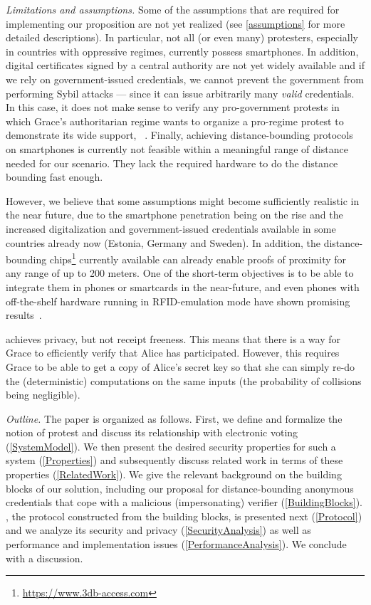 \emph{Limitations and assumptions.} Some of the assumptions that are required 
for implementing our proposition are not yet realized (see \cref{assumptions} 
for more detailed descriptions). In particular, not all (or even many) 
protesters, especially in countries with oppressive regimes, currently possess 
smartphones.
In addition, digital certificates signed by a central authority are not yet widely available and if we rely on government-issued credentials, we cannot prevent the government from performing Sybil attacks --- since it can issue arbitrarily many \emph{valid} credentials. 
In this case, it does not make sense to verify any pro-government protests in 
which Grace's authoritarian regime wants to organize a pro-regime protest to 
demonstrate its wide support, 
\eg~\cite{AlJazeeraOnVenezuela2017,VenezuelanStateWorkersCalledToParticipate}.
Finally, achieving distance-bounding protocols on smartphones is currently not 
feasible within a meaningful range of distance needed for our scenario.
They lack the required hardware to do the distance bounding fast enough.

However, we believe that some assumptions might become sufficiently realistic in 
the near future, due to the smartphone penetration being on the rise and the 
increased digitalization and government-issued credentials available in some 
countries already now (\eg Estonia, Germany and Sweden).
In addition, the distance-bounding 
chips\footnote{\url{https://www.3db-access.com}} currently available can already 
enable proofs of proximity for any range of up to 200 meters.
One of the short-term objectives is to be able to integrate them in phones or smartcards in the near-future, and even phones with off-the-shelf hardware running in RFID-emulation mode have shown promising results~\cite{DBonSmartphones}.

\PRIVO achieves privacy, but not receipt freeness.
This means that there is a way for Grace to efficiently verify that Alice has 
participated.
However, this requires Grace to be able to get a copy of Alice's secret key so that she can simply re-do the (deterministic) computations on the same inputs (the probability of collisions being negligible).

\emph{Outline.} The paper is organized as follows. First, we define and 
formalize the notion of protest and discuss its relationship with electronic 
voting (\cref{SystemModel}).  We then present the desired security properties 
for such a system (\cref{Properties}) and subsequently discuss related work in 
terms of these properties (\cref{RelatedWork}). We give the relevant background 
on the building blocks of our solution, including our proposal for 
distance-bounding anonymous credentials that cope with a malicious 
(impersonating) verifier (\cref{BuildingBlocks}). \PRIVO, the protocol 
constructed from the building blocks, is presented next (\cref{Protocol}) and we 
analyze its security and privacy (\cref{SecurityAnalysis}) as well as 
performance and implementation issues (\cref{PerformanceAnalysis}). We conclude 
with a discussion.
